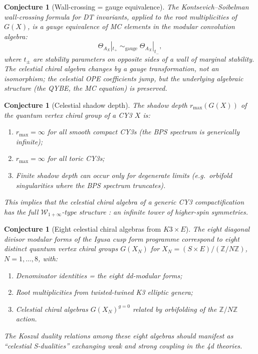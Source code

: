 \documentclass[11pt]{article}
\newtheorem{conjecture}[theorem]{Conjecture}
\theoremstyle{definition}
\theoremstyle{remark}
\newcommand{\cW}{\mathcal{W}}
\begin{document}
\begin{conjecture}[Wall-crossing = gauge equivalence]
\label{conj:wall-crossing}
The Kontsevich--Soibelman wall-crossing formula for DT invariants,
applied to the root multiplicities of $G(X)$, is a gauge
equivalence of MC elements in the modular convolution algebra:
\[
\Theta_{A_X}|_{t_+}
\;\sim_{\mathrm{gauge}}\;
\Theta_{A_X}|_{t_-},
\]
where $t_\pm$ are stability parameters on opposite sides of a
wall of marginal stability. The celestial chiral algebra changes
by a gauge transformation, not an isomorphism; the celestial
OPE coefficients jump, but the underlying algebraic structure
(the QYBE, the MC equation) is preserved.
\end{conjecture}

\begin{conjecture}[Celestial shadow depth]
\label{conj:celestial-shadow-depth}
The shadow depth $r_{\max}(G(X))$ of the quantum vertex chiral
group of a CY3 $X$ is:
\begin{enumerate}[label=(\roman*)]
\item $r_{\max} = \infty$ for all smooth compact CY3s (the BPS
 spectrum is generically infinite);
\item $r_{\max} = \infty$ for all toric CY3s;
\item Finite shadow depth can occur only for degenerate limits
 (e.g.\ orbifold singularities where the BPS spectrum truncates).
\end{enumerate}
This implies that the celestial chiral algebra of a generic
CY3 compactification has the full $\cW_{1+\infty}$-type structure
: an infinite tower of higher-spin symmetries.
\end{conjecture}

\begin{conjecture}[Eight celestial chiral algebras from $K3 \times E$]
\label{conj:eight-celestial}
The eight diagonal divisor modular forms of the Igusa cusp form
programme correspond to eight distinct quantum vertex chiral groups
$G(X_N)$ for $X_N = (S \times E)/(\mathbb{Z}/N\mathbb{Z})$,
$N = 1, \ldots, 8$, with:
\begin{enumerate}[label=(\roman*)]
\item Denominator identities = the eight dd-modular forms;
\item Root multiplicities from twisted-twined K3 elliptic genera;
\item Celestial chiral algebras $G(X_N)^{g=0}$ related by
 orbifolding of the $\mathbb{Z}/N\mathbb{Z}$ action.
\end{enumerate}
The Koszul duality relations among these eight algebras should
manifest as ``celestial S-dualities'' exchanging weak and strong
coupling in the 4d theories.
\end{conjecture}
\end{document}
